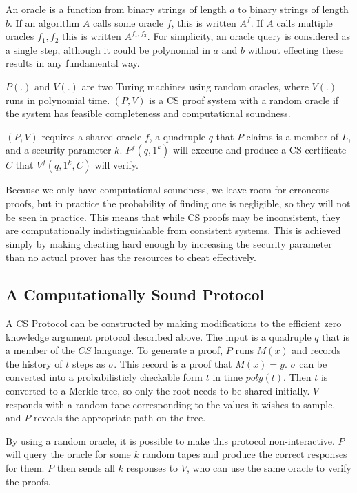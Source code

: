 \documentclass{article}
\begin{document}
An oracle is a function from binary strings of length $a$
to binary strings of length $b$.
If an algorithm $A$
calls some oracle $f$,
this is written $A^f$.
If $A$
calls multiple oracles $f_1, f_2$
this is written $A^{f_1,f_2}$.
For simplicity, an oracle query is considered as a single step,
although it could be polynomial in $a$
and $b$ without effecting these results in any fundamental way.

$P{(.)}$
and $V{(.)}$
are two Turing machines using random oracles, where $V{(.)}$
runs in polynomial time. $(P,V)$
is a CS proof system with a random oracle if the system has feasible
completeness and computational soundness.

$(P,V)$
requires a shared oracle $f$,
a quadruple $q$
that $P$
claims is a member of $L$,
and a security parameter $k$.
$P^f(q,1^k)$
will execute and produce a CS certificate $C$
that $V^f(q,1^k,C)$ will verify.

Because we only have computational soundness, we leave room for
erroneous proofs, but in practice the probability of finding one is
negligible, so they will not be seen in practice. This means that
while CS proofs may be inconsistent, they are computationally
indistinguishable from consistent systems. This is achieved simply by
making cheating hard enough by increasing the security parameter than
no actual prover has the resources to cheat effectively.

\subsection{A Computationally Sound Protocol}

A CS Protocol can be constructed by making modifications to the efficient zero knowledge argument protocol described above. The input is a quadruple $q$ that is a member of the $CS$ language. To generate a proof, $P$ runs $M(x)$ and records the history of $t$ steps as $\sigma$. This record is a proof that $M(x) = y$. $\sigma$ can be converted into a probabilisticly checkable form $t$ in time $poly(t)$. Then $t$ is converted to a Merkle tree, so only the root needs to be shared initially. $V$ responds with a random tape corresponding to the values it wishes to sample, and $P$ reveals the appropriate path on the tree.

By using a random oracle, it is possible to make this protocol non-interactive. $P$ will query the oracle for some $k$ random tapes and produce the correct responses for them. $P$ then sends all $k$ responses to $V$, who can use the same oracle to verify the proofs.
\end{document}

